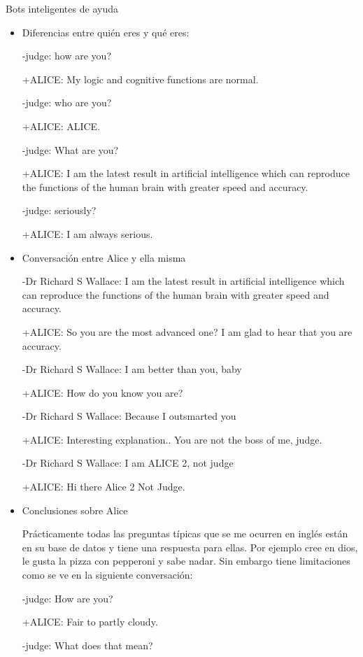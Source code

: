\documentclass[spanish, a4paper, 12pt]{article} 	%
\begin{document}
\begin{section}{Bots inteligentes de ayuda}
\begin{itemize}
		\begin{itemize}
			\item{Diferencias entre quién eres y qué eres:}
			
			-judge: how are you? 
			
			+ALICE: My logic and cognitive functions are normal. 
			
			-judge: who are you? 
			
			+ALICE: ALICE. 
			
			-judge: What are you? 
			
			+ALICE: I am the latest result in artificial intelligence which can reproduce the functions of the human brain with 					greater speed and accuracy. 
			
			-judge: seriously? 
			
			+ALICE: I am always serious.
		
		
		\item{Conversación entre Alice y ella misma}
		
			-Dr Richard S Wallace: I am the latest result in artificial intelligence which can reproduce the functions of the 						human brain with greater speed and accuracy. 
			
			+ALICE: So you are the most advanced one? I am glad to hear that you are accuracy. 
			
			-Dr Richard S Wallace: I am better than you, baby 
			
			+ALICE: How do you know you are? 

			-Dr Richard S Wallace: Because I outsmarted you 
			
			+ALICE: Interesting explanation.. You are not the boss of me, judge. 
			
			-Dr Richard S Wallace: I am ALICE 2, not judge 
			
			+ALICE: Hi there Alice 2 Not Judge. 
			
		\item{Conclusiones sobre Alice}
			
			Prácticamente todas las preguntas típicas que se me ocurren en inglés están en su base de datos y tiene una respuesta para ellas. Por ejemplo cree en dios, le gusta la pizza con pepperoni y sabe nadar. Sin embargo tiene limitaciones como se ve en la siguiente conversación:
			
			-judge: How are you? 
			
			+ALICE: Fair to partly cloudy. 

			-judge: What does that mean? 


\end{itemize}
\end{itemize}
\end{section}
\end{document}
